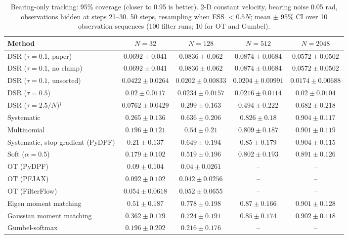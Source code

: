 \begin{table}[H]
\centering
\small
\caption{Bearing-only tracking: 95\% coverage (closer to 0.95 is better). 2-D constant velocity, bearing noise 0.05 rad, observations hidden at steps 21--30. 50 steps, resampling when ESS $<0.5N$; mean $\pm$ 95\% CI over 10 observation sequences (100 filter runs; 10 for OT and Gumbel).}
\label{tab:bearing-coverage95}
\begin{adjustbox}{max width=\linewidth}
\begin{tabular}{lcccc}
\toprule
Method & $N{=}32$ & $N{=}128$ & $N{=}512$ & $N{=}2048$ \\
\midrule
DSR ($\tau{=}0.1$, paper) & $0.0692\pm0.041$ & $0.0836\pm0.062$ & $0.0874\pm0.0684$ & $0.0572\pm0.0502$ \\
DSR ($\tau{=}0.1$, no clamp) & $0.0692\pm0.041$ & $0.0836\pm0.062$ & $0.0874\pm0.0684$ & $0.0572\pm0.0502$ \\
DSR ($\tau{=}0.1$, unsorted) & $0.0422\pm0.0264$ & $0.0202\pm0.00833$ & $0.0204\pm0.00991$ & $0.0174\pm0.00688$ \\
DSR ($\tau{=}0.5$) & $0.02\pm0.0117$ & $0.0234\pm0.0157$ & $0.0216\pm0.0114$ & $0.02\pm0.0104$ \\
DSR ($\tau{=}2.5/N$)$^\dagger$ & $0.0762\pm0.0429$ & $0.299\pm0.163$ & $0.494\pm0.222$ & $0.682\pm0.218$ \\
\midrule
Systematic & $0.265\pm0.136$ & $0.636\pm0.206$ & $0.826\pm0.18$ & $\mathbf{0.904\pm0.117}$ \\
Multinomial & $0.196\pm0.121$ & $0.54\pm0.21$ & $0.809\pm0.187$ & $0.901\pm0.119$ \\
Systematic, stop-gradient (PyDPF) & $0.21\pm0.137$ & $0.649\pm0.194$ & $0.85\pm0.179$ & $0.904\pm0.115$ \\
Soft ($\alpha{=}0.5$) & $0.179\pm0.102$ & $0.519\pm0.196$ & $0.802\pm0.193$ & $0.891\pm0.126$ \\
OT (PyDPF) & $0.09\pm0.104$ & $0.04\pm0.0261$ & -- & -- \\
OT (PFJAX) & $0.092\pm0.102$ & $0.042\pm0.0256$ & -- & -- \\
OT (FilterFlow) & $0.054\pm0.0618$ & $0.052\pm0.0655$ & -- & -- \\
Eigen moment matching & $\mathbf{0.51\pm0.187}$ & $\mathbf{0.778\pm0.198}$ & $\mathbf{0.87\pm0.166}$ & $0.901\pm0.128$ \\
Gaussian moment matching & $0.362\pm0.179$ & $0.724\pm0.191$ & $0.85\pm0.174$ & $0.902\pm0.118$ \\
Gumbel-softmax & $0.196\pm0.202$ & $0.216\pm0.176$ & -- & -- \\

\end{tabular}
\end{adjustbox}
\end{table}
